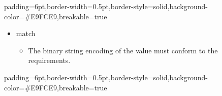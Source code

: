 \documentclass[11pt]{article}
\begin{document}
{%
\begin{mdbmargintb}{6pt}{6pt}%
\begin{mdblock}{padding=6pt,border-width=0.5pt,border-style=solid,background-color=\#E9FCE9,breakable=true}%
\begin{mdpre}%
\end{mdpre}%
\end{mdblock}%
\end{mdbmargintb}%

\begin{itemize}[noitemsep,topsep=\mdcompacttopsep]%

\item{} match

\begin{itemize}[noitemsep,topsep=\mdcompacttopsep]%

\item{}The binary string encoding of the value must conform to the
 requirements.%
\end{itemize}%
\end{itemize}%

\begin{mdbmargintb}{6pt}{6pt}%
\begin{mdblock}{padding=6pt,border-width=0.5pt,border-style=solid,background-color=\#E9FCE9,breakable=true}%
\begin{mdpre}%
\end{mdpre}%
\end{mdblock}%
\end{mdbmargintb}%

}
\end{document}
